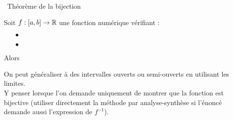 \documentclass[a4paper, 11pt]{article}
\begin{document}
{\begin{rem}
\end{rem}

\ {Th\'eor\`eme de la bijection}\\

{

\begin{theorem} Soit $f: [a,b] \rightarrow \mathbb{R}$ une fonction num\'erique v\'erifiant :
	\begin{itemize}
		\item[$\bullet$] \dotfill \vsec
		\item[$\bullet$] \dotfill \vsec
	\end{itemize}
	Alors \dotfill \vsec
\end{theorem}

}
\vsec

On peut g\'en\'eraliser \`a des intervalles ouverts ou semi-ouverts en utilisant les limites.\\
Y penser lorsque l'on demande uniquement de montrer que la fonction est bijective (utiliser directement la m\'ethode par analyse-synth\`ese si l'\'enonc\'e demande aussi l'expression de $f^{-1}$).

%
%
% 
%
%
% 
%


}
\end{document}
